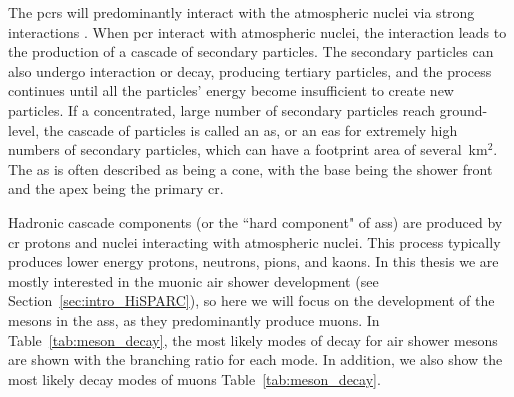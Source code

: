 The \glspl{pcr} will predominantly interact with the atmospheric nuclei via strong interactions \citep{grupen_astroparticle_2005}. When \gls{pcr} interact with atmospheric nuclei, the interaction leads to the production of a cascade of secondary particles. The secondary particles can also undergo interaction or decay, producing tertiary particles, and the process continues until all the particles' energy become insufficient to create new particles. If a concentrated, large number of secondary particles reach ground-level, the cascade of particles is called an \gls{as}, or an \gls{eas} for extremely high numbers of secondary particles, which can have a footprint area of several~km$^2$. The \gls{as} is often described as being a cone, with the base being the shower front and the apex being the primary \gls{cr}.

Hadronic cascade components (or the ``hard component" of \glspl{as}) are produced by \gls{cr} protons and nuclei interacting with atmospheric nuclei. This process typically produces lower energy protons, neutrons, pions, and kaons. In this thesis we are mostly interested in the muonic air shower development (see Section~\ref{sec:intro_HiSPARC}), so here we will focus on the development of the mesons in the \glspl{as}, as they predominantly produce muons. In Table~\ref{tab:meson_decay}, the most likely modes of decay for air shower mesons are shown with the branching ratio for each mode. In addition, we also show the most likely decay modes of muons Table~\ref{tab:meson_decay}. 


